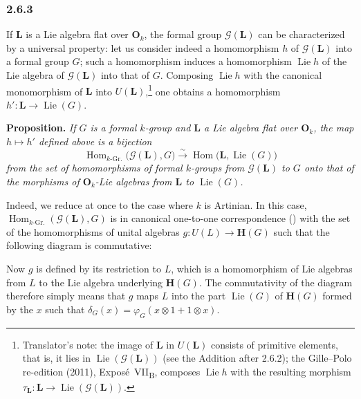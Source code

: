 
\subsubsection*{2.6.3}
\label{sga3:VIIB:2.6.3}

If \(\mathbf L\) is a Lie algebra flat over \(\mathbf O_k\), the formal
group \(\mathscr G(\mathbf L)\) can be characterized by a universal
property: let us consider indeed a homomorphism \(h\) of
\(\mathscr G(\mathbf L)\) into a formal group \(G\); such a homomorphism
induces a homomorphism \(\operatorname{Lie}h\) of the Lie algebra of
\(\mathscr G(\mathbf L)\) into that of \(G\). Composing
\(\operatorname{Lie}h\) with the canonical monomorphism of \(\mathbf L\)
into \(U(\mathbf L)\),\footnote{Translator's note: the image of \(\mathbf L\) in \(U(\mathbf L)\)
consists of primitive elements, that is, it lies in \(\operatorname{Lie}(\mathscr G(\mathbf L))\) (see the
Addition after 2.6.2); the Gille--Polo re-edition (2011), Expos\'e~VII\textsubscript{B}, composes
\(\operatorname{Lie}h\) with the resulting morphism \(\tau_{\mathbf L}\colon\mathbf L\to
\operatorname{Lie}(\mathscr G(\mathbf L))\).} one obtains a homomorphism
\(h':\mathbf L\to\operatorname{Lie}(G)\).

\medskip
\noindent\textbf{Proposition.}
\label{sga3:VIIB:2.6.3:prop}
{\itshape If \(G\) is a formal \(k\)-group and \(\mathbf L\) a Lie algebra
flat over \(\mathbf O_k\), the map \(h\mapsto h'\) defined above is a
bijection
\[
  \operatorname{Hom}_{k\text{-}\mathrm{Gr}.}
    \bigl(\mathscr G(\mathbf L),G\bigr)
  \xrightarrow{\ \sim\ }
  \operatorname{Hom}\bigl(\mathbf L,\operatorname{Lie}(G)\bigr)
\]
from the set of homomorphisms of formal \(k\)-groups from
\(\mathscr G(\mathbf L)\) to \(G\) onto that of the morphisms of
\(\mathbf O_k\)-Lie algebras from \(\mathbf L\) to \(\operatorname{Lie}(G)\).}

Indeed, we reduce at once to the case where \(k\) is Artinian. In this
case, \(\operatorname{Hom}_{k\text{-}\mathrm{Gr}.}(\mathscr G(\mathbf L),G)\) is in
canonical one-to-one correspondence \textup{()} with the set of the
homomorphisms of unital algebras \(g:U(L)\to\mathbf H(G)\) such that the
following diagram is commutative:
\begin{center}
  \label{sga3:VIIB:2.6.3:universal-property-diagram}
\end{center}
Now \(g\) is defined by its restriction to \(L\), which is a homomorphism
of Lie algebras from \(L\) to the Lie algebra underlying
\(\mathbf H(G)\). The commutativity of the diagram therefore simply means
that \(g\) maps \(L\) into the part \(\operatorname{Lie}(G)\) of
\(\mathbf H(G)\) formed by the \(x\) such that
\(\delta_G(x)=\varphi_G(x\otimes1+1\otimes x)\).
